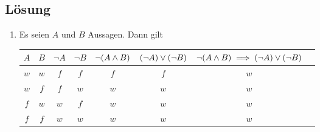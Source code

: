 \documentclass[german,12pt]{homework}
\DeclarePairedDelimiter{\enbrace}{(}{)}
\begin{document}
    \subsection*{Lösung}
    \begin{enumerate}
        \item Es seien \(A\) und \(B\) Aussagen. Dann gilt
        \begin{center}
            \begin{tabular}{cccccccc}
                \toprule
                \(A\) & \(B\) & \(\lnot{A}\) & \(\lnot{B}\) & \(\lnot\enbrace*{A \land B}\) & \(\enbrace*{\lnot{A}} \lor \enbrace*{\lnot{B}}\) & \(\lnot\enbrace*{A \land B} \implies \enbrace*{\lnot{A}} \lor \enbrace*{\lnot{B}}\)\\
                \midrule
                \(w\) & \(w\) & \(f\) & \(f\) & \(f\) & \(f\) & \(w\)\\
                \(w\) & \(f\) & \(f\) & \(w\) & \(w\) & \(w\) & \(w\)\\
                \(f\) & \(w\) & \(w\) & \(f\) & \(w\) & \(w\) & \(w\)\\
                \(f\) & \(f\) & \(w\) & \(w\) & \(w\) & \(w\) & \(w\)\\
                \bottomrule
            \end{tabular}

            \vspace{.2in}


\end{center}
\end{enumerate}
\end{document}
